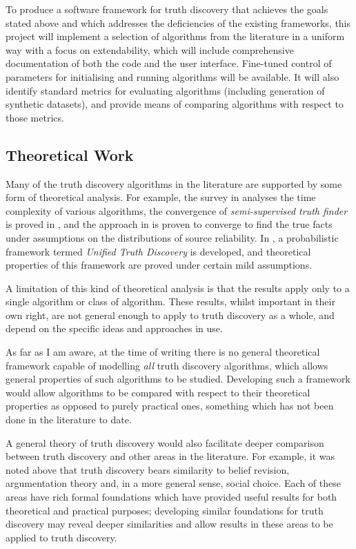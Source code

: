\documentclass[../main.tex]{subfiles}
\begin{document}

To produce a software framework for truth discovery that achieves the goals
stated above and which addresses the deficiencies of the existing frameworks,
this project will implement a selection of algorithms from the literature in a
uniform way with a focus on extendability, which will include comprehensive
documentation of both the code and the user interface. Fine-tuned control of
parameters for initialising and running algorithms will be available. It will
also identify standard metrics for evaluating algorithms (including generation
of synthetic datasets), and provide means of comparing algorithms with respect
to those metrics.

\subsection{Theoretical Work}

Many of the truth discovery algorithms in the literature are supported by some
form of theoretical analysis. For example, the survey in
\cite{gupta_han_survey} analyses the time complexity of various algorithms, the
convergence of \emph{semi-supervised truth finder} is proved in
\cite{yin_supervised}, and the approach in \cite{xiao} is proven to converge to
find the true facts under assumptions on the distributions of source
reliability. In \cite{xiao_thesis}, a probabilistic framework termed
\emph{Unified Truth Discovery} is developed, and theoretical properties of this
framework are proved under certain mild assumptions.

A limitation of this kind of theoretical analysis is that the results apply
only to a single algorithm or class of algorithm. These results, whilst
important in their own right, are not general enough to apply to truth
discovery as a whole, and depend on the specific ideas and approaches in use.

As far as I am aware, at the time of writing there is no general theoretical
framework capable of modelling \emph{all} truth discovery algorithms, which
allows general properties of such algorithms to be studied. Developing such a
framework would allow algorithms to be compared with respect to their
theoretical properties as opposed to purely practical ones, something which has
not been done in the literature to date.

A general theory of truth discovery would also facilitate deeper comparison
between truth discovery and other areas in the literature. For example, it was
noted above that truth discovery bears similarity to belief revision,
argumentation theory and, in a more general sense, social choice. Each of these
areas have rich formal foundations which have provided useful results for both
theoretical and practical purposes; developing similar foundations for truth
discovery may reveal deeper similarities and allow results in these areas to be
applied to truth discovery.
\end{document}
